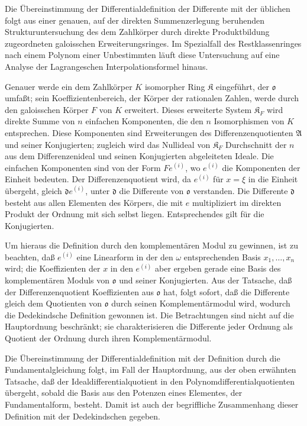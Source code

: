 \documentclass[11pt]{article}
\begin{document}
Die Übereinstimmung der Differentialdefinition der Differente mit der üblichen folgt aus einer genauen, auf der direkten Summenzerlegung beruhenden Strukturuntersuchung des dem Zahlkörper durch direkte Produktbildung zugeordneten galoisschen Erweiterungsringes. Im Spezialfall des Restklassenringes nach einem Polynom einer Unbestimmten läuft diese Untersuchung auf eine Analyse der Lagrangeschen Interpolationsformel hinaus.

Genauer werde ein dem Zahlkörper $K$ isomorpher Ring $\mathfrak K$ eingeführt, der $\mathfrak o$ umfaßt; sein Koeffizientenbereich, der Körper der rationalen Zahlen, werde durch den galoisschen Körper $F$ von $K$ erweitert. Dieses erweiterte System $\mathfrak K_F$ wird direkte Summe von $n$ einfachen Komponenten, die den $n$ Isomorphismen von $K$ entsprechen. Diese Komponenten sind Erweiterungen des Differenzenquotienten $\mathfrak A$ und seiner Konjugierten; zugleich wird das Nullideal von $\mathfrak K_F$ Durchschnitt der $n$ aus dem Differenzenideal und seinen Konjugierten abgeleiteten Ideale. Die einfachen Komponenten sind von der Form $Fe^{(i)}$, wo $e^{(i)}$ die Komponenten der Einheit bedeuten. Der Differenzenquotient wird, da $e^{(i)}$ für $x=\xi$ in die Einheit übergeht, gleich $\mathfrak d e^{(i)}$, unter $\mathfrak d$ die Differente von $\mathfrak o$ verstanden. Die Differente $\mathfrak d$ besteht aus allen Elementen des Körpers, die mit $e$ multipliziert im direkten Produkt der Ordnung mit sich selbst liegen. Entsprechendes gilt für die Konjugierten.

Um hieraus die Definition durch den komplementären Modul zu gewinnen, ist zu beachten, daß $e^{(i)}$ eine Linearform in der den $\omega$ entsprechenden Basis $x_1,\ldots,x_n$ wird; die Koeffizienten der $x$ in den $e^{(i)}$ aber ergeben gerade eine Basis des komplementären Moduls von $\mathfrak o$ und seiner Konjugierten. Aus der Tatsache, daß der Differenzenquotient Koeffizienten aus $\mathfrak o$ hat, folgt sofort, daß die Differente gleich dem Quotienten von $\mathfrak o$ durch seinen Komplementärmodul wird, wodurch die Dedekindsche Definition gewonnen ist. Die Betrachtungen sind nicht auf die Hauptordnung beschränkt; sie charakterisieren die Differente jeder Ordnung als Quotient der Ordnung durch ihren Komplementärmodul.

Die Übereinstimmung der Differentialdefinition mit der Definition durch die Fundamentalgleichung folgt, im Fall der Hauptordnung, aus der oben erwähnten Tatsache, daß der Idealdifferentialquotient in den Polynomdifferentialquotienten übergeht, sobald die Basis aus den Potenzen eines Elementes, der Fundamentalform, besteht. Damit ist auch der begriffliche Zusammenhang dieser Definition mit der Dedekindschen gegeben.
\end{document}
